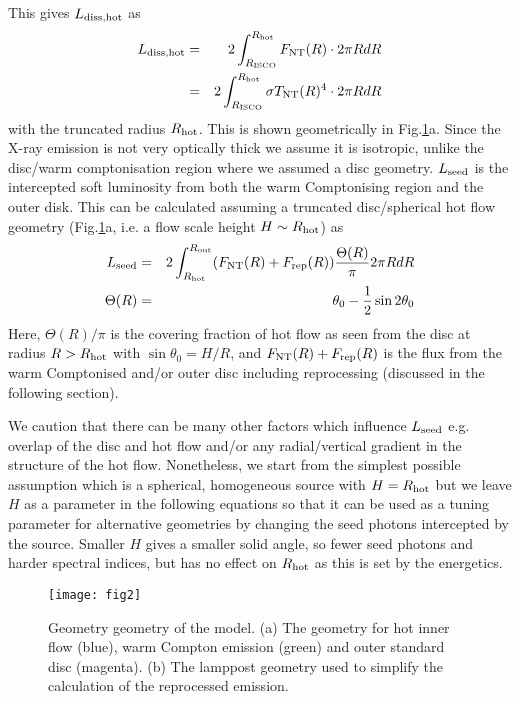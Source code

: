 \documentclass[a4paper,fleqn,usenatbib]{mnras}
\begin{document}
This gives $L_{\rm diss,hot}$ as
\begin{eqnarray}
\label{eq:Lhotdiss}
L _{\rm diss, hot}&=&2\int_{R_{\rm ISCO}}^{R_{\rm hot}} F_{\rm NT}(R)\cdot 2\pi R dR \nonumber \\
&=&2\int_{R_{\rm ISCO}}^{R_{\rm hot}} \sigma T_{\rm NT} (R)^4\cdot 2\pi R dR
\end{eqnarray}
with the  truncated radius $R_{\rm hot}$. This is shown geometrically
in Fig.\ref{fig:geometry}a. 
Since the X-ray emission is not very optically thick we assume it is
isotropic, unlike the disc/warm comptonisation region where we assumed a disc geometry.
%
$L_{\rm seed}$ is the intercepted soft luminosity from both 
the warm Comptonising region and the 
outer disk. This can be calculated assuming a
truncated disc/spherical hot flow geometry (Fig.\ref{fig:geometry}a, i.e. a flow scale height 
$H\sim R_{\rm hot}$) as
 \begin{eqnarray}
\label{eq:Lseed}
L_{\rm seed}&=&2\int_{R_{\rm hot}} ^{R_{\rm out}}  (F_{\rm NT}(R)+F_{\rm rep}(R))\frac{\Theta (R)}{\pi} 2\pi R dR\\
\Theta(R)&=&\theta_0-\frac{1}{2}\sin 2\theta_0
\label{eq:theta}
\end{eqnarray}
Here, $\Theta(R)/\pi$ is the covering fraction of hot flow as seen from
the disc at radius $R>R_{\rm hot}$ with $\sin \theta_0=H/R$,
and $F_{\rm NT}(R)+F_{\rm rep}(R)$ is the flux from the warm
Comptonised and/or outer disc including reprocessing (discussed in the 
following section). 

We caution that there can be many 
other factors which influence  $L_{\rm seed}$ e.g. overlap of the disc and hot flow
\citep{zdziarski1999} and/or any radial/vertical gradient in the structure of the hot flow. 
Nonetheless, we start from the simplest  possible assumption which is a spherical, homogeneous source
with $H=R_{\rm hot}$ but we leave $H$ as a parameter in the following 
equations so that it can be used as a tuning parameter for alternative geometries by 
changing the seed photons intercepted by the source. Smaller $H$ gives a smaller solid angle, so fewer
seed photons and harder spectral indices, but has no effect on $R_{\rm hot}$ as this is set by the energetics. 

\begin{figure}
\begin{center}
	\texttt{[image: fig2]}
\end{center}
    \caption{Geometry geometry of the model. (a) The geometry for hot
      inner flow (blue), warm Compton emission (green) and outer
      standard disc (magenta). (b) The lamppost geometry used to
      simplify the calculation of the reprocessed emission.}
    \label{fig:geometry}
\end{figure}
\end{document}
